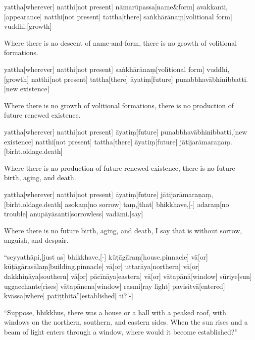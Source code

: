 \begin{samepage}
\begingl[glneveryline={\PaliGlossA,\PaliGlossB}]
yattha[wherever] natthi[not present] nāmarūpassa[name\&form] avakkanti,[appearance] natthi[not present] tattha[there] saṅkhārānaṃ[volitional form] vuddhi.[growth]
\endgl
\nopagebreak
\linespread{0.5}
\begin{spacin}{0.2}
{\PaliGlossFT Where there is no descent of name-and-form, there is no growth of volitional formations.}
\end{spacin}
\vskip 12pt
\end{samepage}
\begin{samepage}
\begingl[glneveryline={\PaliGlossA,\PaliGlossB}]
yattha[wherever] natthi[not present] saṅkhārānaṃ[volitional form] vuddhi,[growth] natthi[not present] tattha[there] āyatiṃ[future] punabbhavābhinibbatti.[new existence]
\endgl
\nopagebreak
\linespread{0.5}
\begin{spacin}{0.2}
{\PaliGlossFT Where there is no growth of volitional formations, there is no production of future renewed existence.}
\end{spacin}
\vskip 12pt
\end{samepage}
\begin{samepage}
\begingl[glneveryline={\PaliGlossA,\PaliGlossB}]
yattha[wherever] natthi[not present] āyatiṃ[future] punabbhavābhinibbatti,[new existence] natthi[not present] tattha[there] āyatiṃ[future] jātijarāmaraṇaṃ.[birht.oldage.death]
\endgl
\nopagebreak
\linespread{0.5}
\begin{spacin}{0.2}
{\PaliGlossFT Where there is no production of future renewed existence, there is no future birth, aging, and death.}
\end{spacin}
\vskip 12pt
\end{samepage}
\begin{samepage}
\begingl[glneveryline={\PaliGlossA,\PaliGlossB}]
yattha[wherever] natthi[not present] āyatiṃ[future] jātijarāmaraṇaṃ,[birht.oldage.death] asokaṃ[no sorrow] taṃ,[that] bhikkhave,[-] adaraṃ[no trouble] anupāyāsanti[sorrowless] vadāmi.[say]
\endgl
\nopagebreak
\linespread{0.5}
\begin{spacin}{0.2}
{\PaliGlossFT Where there is no future birth, aging, and death, I say that is without sorrow, anguish, and despair.}
\end{spacin}
\vskip 12pt
\end{samepage}
\vskip 0.2in
\begin{samepage}
\begingl[glneveryline={\PaliGlossA,\PaliGlossB}]
“seyyathāpi,[just as] bhikkhave,[-] kūṭāgāraṃ[house.pinnacle] vā[or] kūṭāgārasālaṃ[building.pinnacle] vā[or] uttarāya[northern] vā[or] dakkhiṇāya[southern] vā[or] pācīnāya[eastern] vā[or] vātapānā[window] sūriye[sun] uggacchante[rises] vātapānena[window] rasmi[ray light] pavisitvā[entered] kvāssa[where] patiṭṭhitā”[established] ti?[-]
\endgl
\nopagebreak
\linespread{0.5}
\begin{spacin}{0.2}
{\PaliGlossFT “Suppose, bhikkhus, there was a house or a hall with a peaked roof, with windows on the northern, southern, and eastern sides.  When the sun rises and a beam of light enters through a window, where would it become established?”}
\end{spacin}
\vskip 12pt
\end{samepage}
